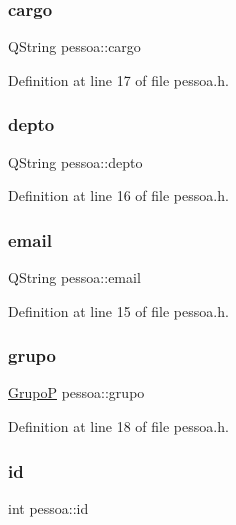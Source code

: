 \subsubsection{\texorpdfstring{cargo}{cargo}}
{\footnotesize\ttfamily Q\+String pessoa\+::cargo}



Definition at line 17 of file pessoa.\+h.

\hypertarget{classpessoa_a612f53ad664ff1afb6582ed1f8711522}{}\label{classpessoa_a612f53ad664ff1afb6582ed1f8711522} 
\subsubsection{\texorpdfstring{depto}{depto}}
{\footnotesize\ttfamily Q\+String pessoa\+::depto}



Definition at line 16 of file pessoa.\+h.

\hypertarget{classpessoa_ac50713f68cf6f093f64d5d5052c1e175}{}\label{classpessoa_ac50713f68cf6f093f64d5d5052c1e175} 
\subsubsection{\texorpdfstring{email}{email}}
{\footnotesize\ttfamily Q\+String pessoa\+::email}



Definition at line 15 of file pessoa.\+h.

\hypertarget{classpessoa_a1cc497f533336ea9451cf321d355afed}{}\label{classpessoa_a1cc497f533336ea9451cf321d355afed} 
\subsubsection{\texorpdfstring{grupo}{grupo}}
{\footnotesize\ttfamily \hyperlink{class_grupo_p}{GrupoP} pessoa\+::grupo}



Definition at line 18 of file pessoa.\+h.

\hypertarget{classpessoa_a8e80bd7d70d7d29b248ef5ec77720b5b}{}\label{classpessoa_a8e80bd7d70d7d29b248ef5ec77720b5b} 
\subsubsection{\texorpdfstring{id}{id}}
{\footnotesize\ttfamily int pessoa\+::id}



